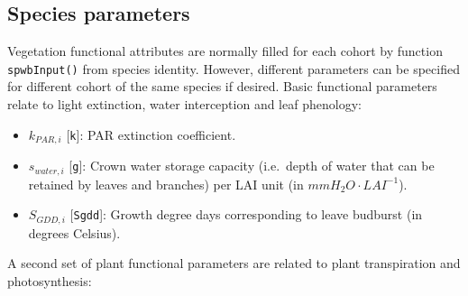 \documentclass[]{book}
\providecommand{\tightlist}{%
  \setlength{\itemsep}{0pt}\setlength{\parskip}{0pt}}
\begin{document}
\subsection{Species parameters}\label{species-parameters}

Vegetation functional attributes are normally filled for each cohort by
function \texttt{spwbInput()} from species identity. However, different
parameters can be specified for different cohort of the same species if
desired. Basic functional parameters relate to light extinction, water
interception and leaf phenology:

\begin{itemize}
\tightlist
\item
  \(k_{PAR,i}\) {[}\texttt{k}{]}: PAR extinction coefficient.
\item
  \(s_{water, i}\) {[}\texttt{g}{]}: Crown water storage capacity
  (i.e.~depth of water that can be retained by leaves and branches) per
  LAI unit (in \(mmH_2O·LAI^{-1}\)).
\item
  \(S_{GDD,i}\) {[}\texttt{Sgdd}{]}: Growth degree days corresponding to
  leave budburst (in degrees Celsius).
\end{itemize}

A second set of plant functional parameters are related to plant
transpiration and photosynthesis:
\end{document}
